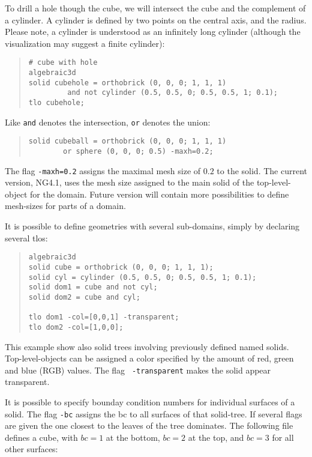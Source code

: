 \documentclass[12pt]{book}
\begin{document}
To drill a hole though the cube, we will intersect the cube
and the complement of a cylinder. A cylinder is defined by two points
on the central axis, and the radius.  Please note, a cylinder is
understood as an infinitely long cylinder (although the visualization
may suggest a finite cylinder):
\begin{quote}
\begin{verbatim}
# cube with hole
algebraic3d
solid cubehole = orthobrick (0, 0, 0; 1, 1, 1)
         and not cylinder (0.5, 0.5, 0; 0.5, 0.5, 1; 0.1);
tlo cubehole;
\end{verbatim}
\end{quote}

Like {\tt and} denotes the intersection, {\tt or} denotes the union:
\begin{quote}
\begin{verbatim}
solid cubeball = orthobrick (0, 0, 0; 1, 1, 1)
        or sphere (0, 0, 0; 0.5) -maxh=0.2;
\end{verbatim}
\end{quote}
The flag {\tt -maxh=0.2} assigns the maximal mesh size of $0.2$ to
the solid. The current version, NG4.1, uses the mesh size assigned to
the main solid of the top-level-object for the domain. Future version
will contain more possibilities to define mesh-sizes for parts of a
domain.

It is possible to define geometries with several sub-domains, simply
by declaring several tlos: 
\begin{quote}
\begin{verbatim}
algebraic3d
solid cube = orthobrick (0, 0, 0; 1, 1, 1);
solid cyl = cylinder (0.5, 0.5, 0; 0.5, 0.5, 1; 0.1);
solid dom1 = cube and not cyl;
solid dom2 = cube and cyl;

tlo dom1 -col=[0,0,1] -transparent;
tlo dom2 -col=[1,0,0];
\end{verbatim}
\end{quote}
This example show also solid trees involving previously defined named
solids. Top-level-objects can be assigned a color specified by the
amount of red, green and blue (RGB) values. The flag {\tt
  -transparent} makes the solid appear transparent.


It is possible to specify bounday condition numbers for individual
surfaces of a solid. The flag {\tt -bc} assigns the bc to all 
surfaces of that solid-tree. If several flags are given the one closest
to the leaves of the tree dominates. The following file defines a 
cube, with $bc=1$ at the bottom, $bc=2$ at the top, and $bc=3$ for 
all other surfaces:
\end{document}
